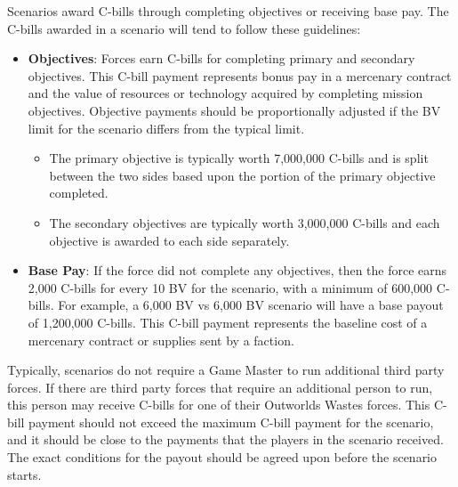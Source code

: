 Scenarios award C-bills through completing objectives or receiving base pay.
The C-bills awarded in a scenario will tend to follow these guidelines:

\begin{itemize}

\item {\bfseries Objectives}: Forces earn C-bills for completing primary and secondary objectives.
This C-bill payment represents bonus pay in a mercenary contract and the value of resources or technology acquired by completing mission objectives.
Objective payments should be proportionally adjusted if the BV limit for the scenario differs from the typical limit.

\begin{itemize}

\item The primary objective is typically worth 7,000,000 C-bills and is split between the two sides based upon the portion of the primary objective completed.

\item The secondary objectives are typically worth 3,000,000 C-bills and each objective is awarded to each side separately.

\end{itemize}

\item {\bfseries Base Pay}: If the force did not complete any objectives, then the force earns 2,000 C-bills for every 10 BV for the scenario, with a minimum of 600,000 C-bills.
For example, a 6,000 BV vs 6,000 BV scenario will have a base payout of 1,200,000 C-bills.
This C-bill payment represents the baseline cost of a mercenary contract or supplies sent by a faction.

\end{itemize}

Typically, scenarios do not require a Game Master to run additional third party forces.
If there are third party forces that require an additional person to run, this person may receive C-bills for one of their Outworlds Wastes forces.
This C-bill payment should not exceed the maximum C-bill payment for the scenario, and it should be close to the payments that the players in the scenario received.
The exact conditions for the payout should be agreed upon before the scenario starts.
